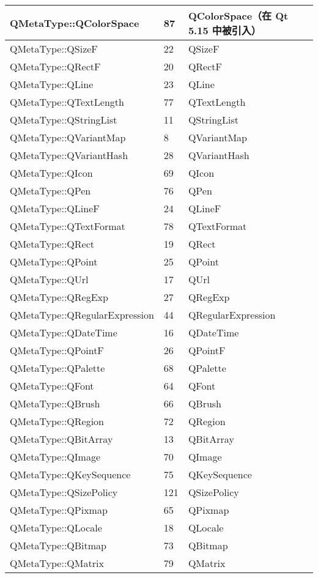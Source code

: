 \begin{longtable}[l]{|l|l|m{20em}|}
\hline
QMetaType::QColorSpace&	87&	QColorSpace（在 Qt 5.15 中被引入）\\
\hline
QMetaType::QSizeF	&22	&QSizeF\\
\hline
QMetaType::QRectF	&20	&QRectF\\
\hline
QMetaType::QLine	&23	&QLine\\
\hline
QMetaType::QTextLength	&77&	QTextLength\\
\hline
QMetaType::QStringList	&11&	QStringList\\
\hline
QMetaType::QVariantMap	&8&	QVariantMap\\
\hline
QMetaType::QVariantHash	&28&	QVariantHash\\
\hline
QMetaType::QIcon&	69&	QIcon\\
\hline
QMetaType::QPen	&76	&QPen \\
\hline
QMetaType::QLineF	&24&	QLineF\\
\hline
QMetaType::QTextFormat&	78&	QTextFormat \\
\hline
QMetaType::QRect&	19	&QRect \\
\hline
QMetaType::QPoint&	25	&QPoint \\
\hline
QMetaType::QUrl	&17	&QUrl \\
\hline
QMetaType::QRegExp	&27	&QRegExp \\
\hline
QMetaType::QRegularExpression	&44	&QRegularExpression \\
\hline
QMetaType::QDateTime	&16&	QDateTime\\
\hline
QMetaType::QPointF	&26&	QPointF\\
\hline
QMetaType::QPalette	&68	&QPalette\\
\hline
QMetaType::QFont	&64&	QFont\\
\hline
QMetaType::QBrush	&66	&QBrush\\
\hline
QMetaType::QRegion&	72&	QRegion\\
\hline
QMetaType::QBitArray&	13	&QBitArray\\
\hline
QMetaType::QImage	&70	&QImage\\
\hline
QMetaType::QKeySequence	&75	&QKeySequence\\
\hline
QMetaType::QSizePolicy&	121&	QSizePolicy\\
\hline
QMetaType::QPixmap&	65	&QPixmap\\
\hline
QMetaType::QLocale&	18	&QLocale\\
\hline
QMetaType::QBitmap&	73&	QBitmap\\
\hline
QMetaType::QMatrix&	79&	QMatrix\\

\end{longtable}

